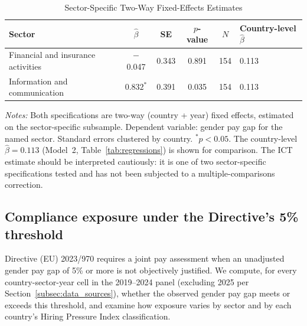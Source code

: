 \documentclass[12pt,a4paper]{article}
\begin{document}
\begin{table}[htbp]
\caption{Sector-Specific Two-Way Fixed-Effects Estimates}
\label{tab:sectorfe}
\begin{threeparttable}
\begin{tabular}{lccccl}
\toprule
Sector & $\hat{\beta}$ & SE & $p$-value & $N$ & Country-level $\hat{\beta}$ \\
\midrule
Financial and insurance activities & $-$0.047 & 0.343 & 0.891 & 154 & 0.113 \\
Information and communication      & $0.832^{*}$ & 0.391 & 0.035 & 154 & 0.113 \\
\bottomrule
\end{tabular}
\begin{tablenotes}
\footnotesize
\item \textit{Notes:} Both specifications are two-way (country + year) fixed
  effects, estimated on the sector-specific subsample. Dependent variable:
  gender pay gap for the named sector.  Standard errors clustered by country.
  $^{*}p<0.05$.  The country-level $\hat{\beta}=0.113$ (Model~2,
  Table~\ref{tab:regressions}) is shown for comparison.  The ICT estimate
  should be interpreted cautiously: it is one of two sector-specific
  specifications tested and has not been subjected to a multiple-comparisons
  correction.
\end{tablenotes}
\end{threeparttable}
\end{table}

\subsection{Compliance exposure under the Directive's 5\% threshold}
\label{subsec:exposure}

Directive (EU) 2023/970 requires a joint pay assessment when an unadjusted
gender pay gap of 5\% or more is not objectively justified.  We compute, for
every country-sector-year cell in the 2019--2024 panel (excluding 2025 per
Section~\ref{subsec:data_sources}), whether the observed gender pay gap meets or
exceeds this threshold, and examine how exposure varies by sector and by each
country's Hiring Pressure Index classification.
\end{document}
